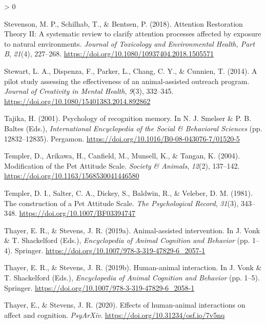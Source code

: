 \documentclass[
  english,
  pub,floatsintext]{apa6}
\newlength{\cslhangindent}
\newenvironment{CSLReferences}[2] %
 {%
  \setlength{\parindent}{0pt}
  \ifodd #1 \everypar{\setlength{\hangindent}{\cslhangindent}}\ignorespaces\fi
  \ifnum #2 > 0
  \setlength{\parskip}{#2\baselineskip}
  \fi
 }%
 {}
\begin{document}
\begin{CSLReferences}{1}{0}
\leavevmode\hypertarget{ref-Stevenson.etal.2018}{}%
Stevenson, M. P., Schilhab, T., \& Bentsen, P. (2018). Attention {Restoration Theory II}: A systematic review to clarify attention processes affected by exposure to natural environments. \emph{Journal of Toxicology and Environmental Health, Part B}, \emph{21}(4), 227--268. \url{https://doi.org/10.1080/10937404.2018.1505571}

\leavevmode\hypertarget{ref-Stewart.etal.2014}{}%
Stewart, L. A., Dispenza, F., Parker, L., Chang, C. Y., \& Cunnien, T. (2014). A pilot study assessing the effectiveness of an animal-assisted outreach program. \emph{Journal of Creativity in Mental Health}, \emph{9}(3), 332--345. \url{https://doi.org/10.1080/15401383.2014.892862}

\leavevmode\hypertarget{ref-Tajika.2001}{}%
Tajika, H. (2001). Psychology of recognition memory. In N. J. Smelser \& P. B. Baltes (Eds.), \emph{International {Encyclopedia} of the {Social} \& {Behavioral Sciences}} (pp. 12832--12835). {Pergamon}. \url{https://doi.org/10.1016/B0-08-043076-7/01520-5}

\leavevmode\hypertarget{ref-Templer.etal.2004}{}%
Templer, D., Arikawa, H., Canfield, M., Munsell, K., \& Tangan, K. (2004). Modification of the {Pet Attitude Scale}. \emph{Society \& Animals}, \emph{12}(2), 137--142. \url{https://doi.org/10.1163/1568530041446580}

\leavevmode\hypertarget{ref-Templer.etal.1981}{}%
Templer, D. I., Salter, C. A., Dickey, S., Baldwin, R., \& Veleber, D. M. (1981). The construction of a {Pet Attitude Scale}. \emph{The Psychological Record}, \emph{31}(3), 343--348. \url{https://doi.org/10.1007/BF03394747}

\leavevmode\hypertarget{ref-Thayer.Stevens.2019}{}%
Thayer, E. R., \& Stevens, J. R. (2019a). Animal-assisted intervention. In J. Vonk \& T. Shackelford (Eds.), \emph{Encyclopedia of {Animal Cognition} and {Behavior}} (pp. 1--4). {Springer}. \url{https://doi.org/10.1007/978-3-319-47829-6_2057-1}

\leavevmode\hypertarget{ref-Thayer.Stevens.2019a}{}%
Thayer, E. R., \& Stevens, J. R. (2019b). Human-animal interaction. In J. Vonk \& T. Shackelford (Eds.), \emph{Encyclopedia of {Animal Cognition} and {Behavior}} (pp. 1--5). {Springer}. \url{https://doi.org/10.1007/978-3-319-47829-6_2058-1}

\leavevmode\hypertarget{ref-Thayer.Stevens.2020}{}%
Thayer, E., \& Stevens, J. R. (2020). Effects of human-animal interactions on affect and cognition. \emph{PsyArXiv}. \url{https://doi.org/10.31234/osf.io/7v5nq}


\end{CSLReferences}
\end{document}
